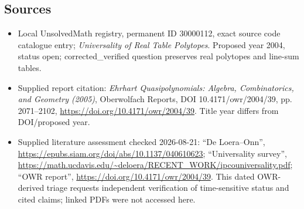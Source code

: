 \documentclass[11pt]{article}
\begin{document}
\subsection{Sources}
\begin{itemize}
\item Local UnsolvedMath registry, permanent ID 30000112, exact source code catalogue entry; \emph{Universality of Real Table Polytopes}. Proposed year 2004, status open; corrected\_verified question preserves real polytopes and line-sum tables.
\item Supplied report citation: \emph{Ehrhart Quasipolynomials: Algebra, Combinatorics, and Geometry (2005)}, Oberwolfach Reports, DOI 10.4171/owr/2004/39, pp. 2071--2102, \url{https://doi.org/10.4171/owr/2004/39}. Title year differs from DOI/proposed year.
\item Supplied literature assessment checked 2026-08-21: ``De Loera--Onn'', \url{https://epubs.siam.org/doi/abs/10.1137/040610623}; ``Universality survey'', \url{https://math.ucdavis.edu/~deloera/RECENT_WORK/ipcouniversality.pdf}; ``OWR report'', \url{https://doi.org/10.4171/owr/2004/39}. This dated OWR-derived triage requests independent verification of time-sensitive status and cited claims; linked PDFs were not accessed here.
\end{itemize}
\end{document}
